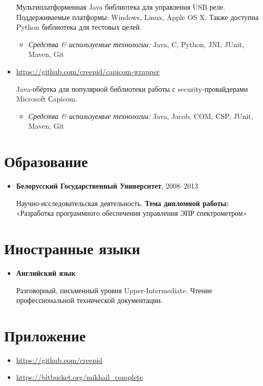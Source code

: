 \documentclass[a4paper, 12pt]{article}
\newcommand{\position}[1]{
    \textbf{#1}}
\newcommand{\itemlabel}[1]{
    \textit{#1:}}
\begin{document}
\begin{itemize}
            Мультиплатформенная Java библиотека для управления USB реле. \newline Поддерживаемые платформы: Windows, Linux, Apple OS X. \newline  Также доступна Python библиотека для тестовых целей.

            \begin{itemize}
                \item \itemlabel{Средства \& используемые технологии} Java, C, Python, JNI, JUnit, Maven, Git
            \end{itemize}
            
            \item \href{https://github.com/creepid/capicom-wrapper}{https://github.com/creepid/capicom-wrapper}

           Java-обёртка для популярной библиотеки работы с security-провайдерами Microsoft Сapicom.

            \begin{itemize}
                \item \itemlabel{Средства \& используемые технологии} Java, Jacob, COM, CSP, JUnit, Maven, Git
            \end{itemize}
            
    \end{itemize}    

\section*{Образование}

    \begin{itemize}

        \item \position{Белорусский Государственный Университет}, 2008--2013

            Научно-исследовательская деятельность.
             \newline\textbf{Тема дипломной работы:} 
             \newline «Разработка программного обеспечения управления ЭПР спектрометром»
    \end{itemize}
    
\section*{Иностранные языки}
 	\begin{itemize}
 		 \item \position{Английский язык}
 		 
 		 Разговорный, письменный уровня Upper-Intermediate. Чтение профессиональной технической документации.  
 	\end{itemize} 

\section*{Приложение}

    \begin{itemize}
        \item \href{https://github.com/creepid}{https://github.com/creepid}
    \end{itemize}
        \begin{itemize}
        \item \href{https://bitbucket.org/mikhail_complete}{https://bitbucket.org/mikhail\_complete}
    \end{itemize}
\end{document}

